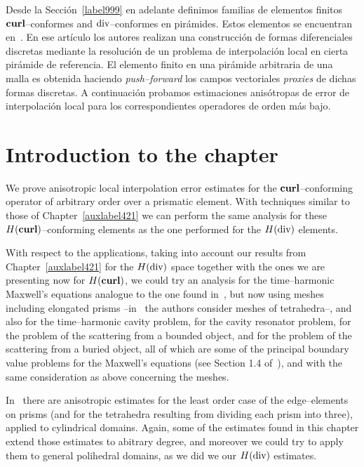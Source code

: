 Desde la Secci\'on~\ref{label999} en adelante definimos
familias de elementos finitos 
$\textbf{curl}$--conformes and $\operatorname{\textrm{div}}$--conformes en pir\'amides. Estos elementos
se encuentran en~\cite{gh99}. En ese art\'iculo los autores
realizan una construcci\'on de formas diferenciales discretas
mediante la resoluci\'on de un problema de interpolaci\'on local
en cierta pir\'amide de referencia. El elemento finito en una
pir\'amide arbitraria de una malla es obtenida haciendo \emph{push--forward}
los campos vectoriales \emph{proxies} de dichas formas discretas.
A continuaci\'on probamos estimaciones anis\'otropas de error de interpolaci\'on
local para los correspondientes operadores de orden m\'as bajo.

\section*{Introduction to the chapter}

We prove anisotropic local interpolation error estimates for the
$\textbf{curl}$--conforming operator of arbitrary order over a prismatic element.
With techniques similar to those of Chapter~\ref{auxlabel421} we can
perform the same analysis for these $H(\textbf{curl})$--conforming elements
as the one performed for the $H(\operatorname{\textrm{div}})$ elements.

With respect to the applications,
taking into account our results 
from Chapter~\ref{auxlabel421}
for the $H(\operatorname{\textrm{div}})$ space together with the ones we are presenting now
for $H(\textbf{curl})$, we could try an analysis for the
time--harmonic Maxwell's equations analogue to the one found
in~\cite{buffaCostabelDauge}, but now using meshes including
elongated prisms --in~\cite{buffaCostabelDauge} the authors consider
meshes of tetrahedra--, and also for the time--harmonic cavity problem,
for the cavity resonator problem, for the problem of the scattering from a 
bounded object, and for the problem of the scattering from a
buried object, all of which are some of the principal boundary value
problems for the Maxwell's equations (see Section 1.4 of~\cite{monk}),
and with the same consideration as above concerning the meshes.

In~\cite{MR1860445} there are anisotropic estimates for 
the least order case of the edge--elements on prisms
(and for the tetrahedra resulting from dividing each prism into three),
applied to cylindrical domains.
Again, some of the estimates found in this chapter extend those estimates
to abitrary degree, and moreover we could try to apply them
to general polihedral domains, as we did we our $H(\operatorname{\textrm{div}})$ estimates.

